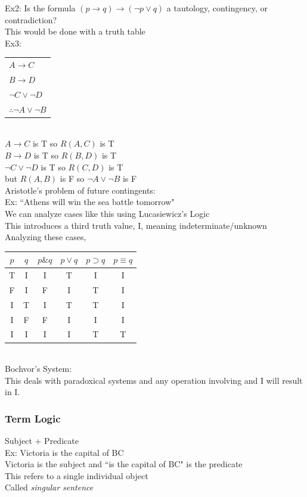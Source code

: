 \documentclass[11pt, fleqn]{article}
\newcommand{\argument}[2]{\begin{tabular}{p{#1 cm}} #2 \end{tabular}}
\begin{document}
Ex2: Is the formula $(p\to q)\to(\lnot p\vee q)$ a tautology, contingency, or contradiction?\\
This would be done with a truth table\\

Ex3:\\
\argument{4}{$A\to C$\\
$B\to D$\\
$\lnot C\vee\lnot D$\\
\hline
$\therefore \lnot A\vee \lnot B$
}\\
$A\to C$ is T so $R(A,C)$ is T\\
$B\to D$ is T so $R(B,D)$ is T\\
$\lnot C\vee \lnot D$ is T so $R(C,D)$ is T\\
but $R(A,B)$ is F so $\lnot A\vee\lnot B$ is F\\

Aristotle's problem of future contingents:\\
Ex: ``Athens will win the sea battle tomorrow"\\
We can analyze cases like this using Lucasiewicz's Logic\\
This introduces a third truth value, I, meaning indeterminate/unknown\\
Analyzing these cases,\\
\begin{tabular}{cc|cccc}
    $p$ & $q$ & $p\& q$ & $p\vee q$ & $p\supset q$ & $p\equiv q$\\
    \hline
    T & I & I & T & I & I\\
    F & I & F & I & T & I\\
    I & T & I & T & T & I\\
    I & F & F & I & I & I\\
    I & I & I & I & T & T
\end{tabular}\\

Bochvor's System:\\
This deals with paradoxical systems and any operation involving and I will result in I.

\subsubsection{Term Logic}

Subject + Predicate\\
Ex: Victoria is the capital of BC\\
Victoria is the subject and ``is the capital of BC" is the predicate\\
This refers to a single individual object\\
Called \textit{singular sentence}\\
\end{document}
